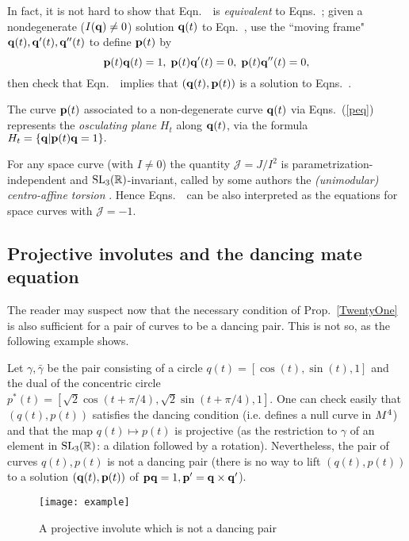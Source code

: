 In fact, it is not hard to show that Eqn.~\peqn\ is {\em equivalent} to Eqns.~\eqnsss; given a nondegenerate ($I(\mathbf q)\neq 0$)
solution  $\mathbf q(t)$ to Eqn.~\peqn, use the ``moving  frame"  $\mathbf q(t), \mathbf q'(t), \mathbf q''(t)$ to define ${\mathbf p}(t)$ by  
\begin{equation}\label{peq}
{\mathbf p}(t)\mathbf q(t)=1, \;{\mathbf p}(t)\mathbf q'(t)=0, \;{\mathbf p}(t)\mathbf q''(t)=0,
\end{equation}
then check that Eqn.~\peqn\ implies  that 
 $(\mathbf q(t), {\mathbf p}(t))$ is a solution to Eqns.~\eqnsss. 
 
The curve ${\mathbf p}(t)$ associated to a non-degenerate curve $\mathbf q(t)$ via Eqns.~(\ref{peq}) represents the   
  {\em osculating plane} $H_t$ along   $\mathbf q(t)$,  via the formula $H_t=\{\mathbf q|{\mathbf p}(t)\mathbf q=1\}.$
  
For any space curve (with $I\neq 0$) the quantity $\mathcal J=J/I^2$ is parametrization-independent  and ${\mathrm{SL}_3(\mathbb{R})}$-invariant, called by some authors  the {\em (unimodular) centro-affine torsion} \cite{O}. Hence Eqns.~\eqnsss\  can be also interpreted as the equations  for space curves with $\mathcal J=-1$.





\subsection{Projective involutes and the  dancing mate equation}\label{sec:mate} The reader may suspect now  that the necessary condition of Prop.~\ref{TwentyOne} is also sufficient for a pair of curves to be a dancing pair. This is not so, as the following example shows. 


\begin{example} Let $\gamma, \bar \gamma$ be the pair consisting of a  circle $q(t)=[\cos(t), \sin(t), 1]$ 
 and the dual of the concentric circle 
$p^*(t)=[\sqrt{2}\cos(t+\pi/4), \sqrt{2}\sin(t+\pi/4), 1].$ 
One can check easily that $(q(t), p(t))$ satisfies the dancing condition (i.e. defines  a null curve in $M^4$) and that the map $q(t)\mapsto p(t)$ is projective (as the restriction to $\gamma$ of an element in ${\mathrm{SL}_3(\mathbb{R})}$: a  dilation followed by a rotation). Nevertheless,  the pair of curves  $q(t), p(t)$ is not a dancing pair  
(there is no way to lift $(q(t), p(t))$ to a solution $(\mathbf q(t), {\mathbf p}(t))$ of ${\mathbf p}\mathbf q=1, {\mathbf p}'=\mathbf q\times \mathbf q'$). 
\end{example}


\begin{figure}[h!]\centering
\texttt{[image: example]}
\caption{A  projective involute which is not a dancing pair}
\end{figure}

